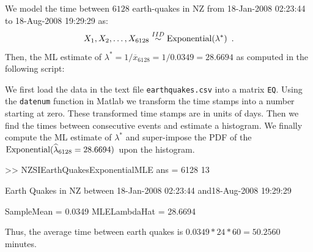 {\begin{figure}[htpb]
\centering   {}
\end{figure}
\begin{labwork}\label{LW:NZSIEarthQuakesExponentialMLE}  
We model the time between $6128$ earth-quakes in NZ from 18-Jan-2008 02:23:44 to 18-Aug-2008 19:29:29 as:
\[
X_1,X_2,\ldots,X_{6128} \overset{IID}{\sim} \mbox{{\rm Exponential}}(\lambda^*) \enspace .
\]
Then, the ML estimate of $\lambda^* = 1/\overline{x}_{6128} = 1/0.0349=28.6694$ as computed in the following script:

We first load the data in the text file {\tt earthquakes.csv} into a matrix {\tt EQ}.  Using the {\tt datenum} function in {\sc Matlab} we transform the time stamps into a number starting at zero.  These transformed time stamps are in units of days.  Then we find the times between consecutive events and estimate a histogram.  We finally compute the ML estimate of $\lambda^*$ and super-impose the PDF of the $\mbox{{\rm Exponential}}(\widehat{\lambda}_{6128}= 28.6694)$ upon the histogram.
\begin{VrbM}
>> NZSIEarthQuakesExponentialMLE
ans =        6128          13

Earth Quakes in NZ between
18-Jan-2008 02:23:44 and18-Aug-2008 19:29:29

SampleMean =    0.0349
MLELambdaHat =   28.6694
\end{VrbM}
Thus, the average time between earth quakes is $0.0349*24*60=50.2560$ minutes.
\end{labwork}
}%

